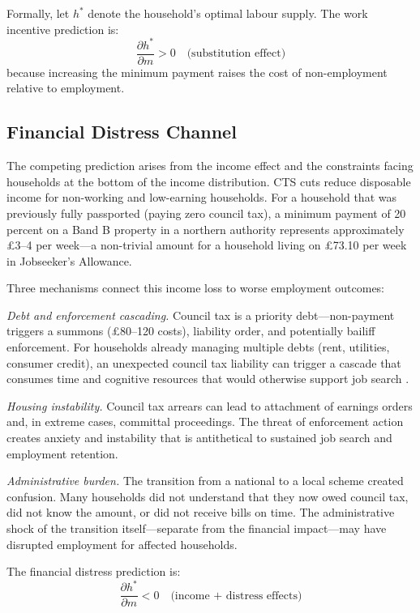 \documentclass[12pt]{article}
\begin{document}
Formally, let $h^*$ denote the household's optimal labour supply. The work incentive prediction is:
\begin{equation}
\frac{\partial h^*}{\partial m} > 0 \quad \text{(substitution effect)}
\end{equation}
because increasing the minimum payment raises the cost of non-employment relative to employment.

\subsection{Financial Distress Channel}

The competing prediction arises from the income effect and the constraints facing households at the bottom of the income distribution. CTS cuts reduce disposable income for non-working and low-earning households. For a household that was previously fully passported (paying zero council tax), a minimum payment of 20 percent on a Band B property in a northern authority represents approximately \pounds 3--4 per week---a non-trivial amount for a household living on \pounds 73.10 per week in Jobseeker's Allowance.

Three mechanisms connect this income loss to worse employment outcomes:

\emph{Debt and enforcement cascading.} Council tax is a priority debt---non-payment triggers a summons (\pounds 80--120 costs), liability order, and potentially bailiff enforcement. For households already managing multiple debts (rent, utilities, consumer credit), an unexpected council tax liability can trigger a cascade that consumes time and cognitive resources that would otherwise support job search \citep{chetty2013using}.

\emph{Housing instability.} Council tax arrears can lead to attachment of earnings orders and, in extreme cases, committal proceedings. The threat of enforcement action creates anxiety and instability that is antithetical to sustained job search and employment retention.

\emph{Administrative burden.} The transition from a national to a local scheme created confusion. Many households did not understand that they now owed council tax, did not know the amount, or did not receive bills on time. The administrative shock of the transition itself---separate from the financial impact---may have disrupted employment for affected households.

The financial distress prediction is:
\begin{equation}
\frac{\partial h^*}{\partial m} < 0 \quad \text{(income + distress effects)}
\end{equation}
\end{document}
